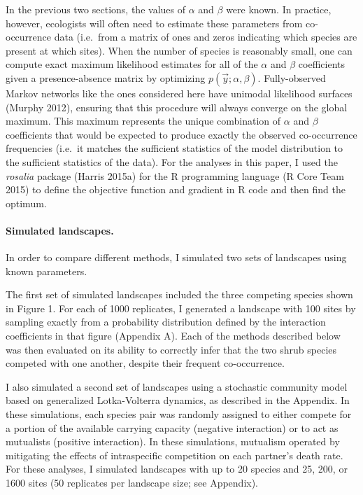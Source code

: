 \documentclass[12pt,]{article}
\begin{document}
\begin{spacing}{1.9}
\begin{flushleft}
In the previous two sections, the values of \(\alpha\) and \(\beta\)
were known. In practice, however, ecologists will often need to estimate
these parameters from co-occurrence data (i.e.~from a matrix of ones and
zeros indicating which species are present at which sites). When the
number of species is reasonably small, one can compute exact maximum
likelihood estimates for all of the \(\alpha\) and \(\beta\)
coefficients given a presence-absence matrix by optimizing
\(p(\vec{y}; \alpha, \beta)\). Fully-observed Markov networks like the
ones considered here have unimodal likelihood surfaces (Murphy 2012),
ensuring that this procedure will always converge on the global maximum.
This maximum represents the unique combination of \(\alpha\) and
\(\beta\) coefficients that would be expected to produce exactly the
observed co-occurrence frequencies (i.e.~it matches the sufficient
statistics of the model distribution to the sufficient statistics of the
data). For the analyses in this paper, I used the \emph{rosalia} package
(Harris 2015a) for the R programming language (R Core Team 2015) to
define the objective function and gradient in R code and then find the
optimum.

\paragraph{Simulated landscapes.}\label{simulated-landscapes.}

In order to compare different methods, I simulated two sets of
landscapes using known parameters.

The first set of simulated landscapes included the three competing
species shown in Figure 1. For each of 1000 replicates, I generated a
landscape with 100 sites by sampling exactly from a probability
distribution defined by the interaction coefficients in that figure
(Appendix A). Each of the methods described below was then evaluated on
its ability to correctly infer that the two shrub species competed with
one another, despite their frequent co-occurrence.

I also simulated a second set of landscapes using a stochastic community
model based on generalized Lotka-Volterra dynamics, as described in the
Appendix. In these simulations, each species pair was randomly assigned
to either compete for a portion of the available carrying capacity
(negative interaction) or to act as mutualists (positive interaction).
In these simulations, mutualism operated by mitigating the effects of
intraspecific competition on each partner's death rate. For these
analyses, I simulated landscapes with up to 20 species and 25, 200, or
1600 sites (50 replicates per landscape size; see Appendix).


\end{flushleft}
\end{spacing}
\end{document}
